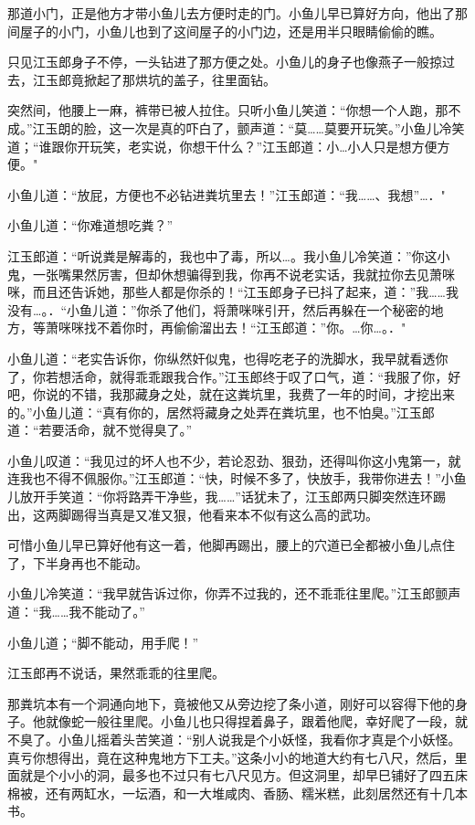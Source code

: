 \documentclass[12pt,oneside]{book}
\begin{document}
那道小门，正是他方才带小鱼儿去方便时走的门。小鱼儿早已算好方向，他出了那间屋子的小门，小鱼儿也到了这间屋子的小门边，还是用半只眼睛偷偷的瞧。

只见江玉郎身子不停，一头钻进了那方便之处。小鱼儿的身子也像燕子一般掠过去，江玉郎竟掀起了那烘坑的盖子，往里面钻。

突然间，他腰上一麻，裤带已被人拉住。只听小鱼儿笑道：``你想一个人跑，那不成。''江玉朗的脸，这一次是真的吓白了，颤声道：``莫\ldots\ldots 莫要开玩笑。''小鱼儿冷笑道；``谁跟你开玩笑，老实说，你想干什么？''江玉郎道：小\ldots 小人只是想方便方便。"

小鱼儿道：``放屁，方便也不必钻进粪坑里去！''江玉郎道：``我\ldots\ldots、我想''\ldots．"

小鱼儿道：``你难道想吃粪？''

江玉郎道：``听说粪是解毒的，我也中了毒，所以\ldots。我小鱼儿冷笑道：''你这小鬼，一张嘴果然厉害，但却休想骗得到我，你再不说老实话，我就拉你去见萧咪咪，而且还告诉她，那些人都是你杀的！``江玉郎身子已抖了起来，道：''我\ldots\ldots 我没有\ldots。．``小鱼儿道：''你杀了他们，将萧咪咪引开，然后再躲在一个秘密的地方，等萧咪咪找不着你时，再偷偷溜出去！``江玉郎道：''你。\ldots 你\ldots。．"

小鱼儿道：``老实告诉你，你纵然奸似鬼，也得吃老子的洗脚水，我早就看透你了，你若想活命，就得乖乖跟我合作。''江玉郎终于叹了口气，道：``我服了你，好吧，你说的不错，我那藏身之处，就在这粪坑里，我费了一年的时间，才挖出来的。''小鱼儿道：``真有你的，居然将藏身之处弄在粪坑里，也不怕臭。''江玉郎道：``若要活命，就不觉得臭了。''

小鱼儿叹道：``我见过的坏人也不少，若论忍劲、狠劲，还得叫你这小鬼第一，就连我也不得不佩服你。''江玉郎道：``快，时候不多了，快放手，我带你进去！''小鱼儿放开手笑道：``你将路弄干净些，我\ldots\ldots{}''话犹未了，江玉郎两只脚突然连环踢出，这两脚踢得当真是又准又狠，他看来本不似有这么高的武功。

可惜小鱼儿早已算好他有这一着，他脚再踢出，腰上的穴道已全都被小鱼儿点住了，下半身再也不能动。

小鱼儿冷笑道：``我早就告诉过你，你弄不过我的，还不乖乖往里爬。''江玉郎颤声道：``我\ldots\ldots 我不能动了。''

小鱼儿道；``脚不能动，用手爬！''

江玉郎再不说话，果然乖乖的往里爬。

那粪坑本有一个洞通向地下，竟被他又从旁边挖了条小道，刚好可以容得下他的身子。他就像蛇一般往里爬。小鱼儿也只得捏着鼻子，跟着他爬，幸好爬了一段，就不臭了。小鱼儿摇着头苦笑道：``别人说我是个小妖怪，我看你才真是个小妖怪。真亏你想得出，竟在这种鬼地方下工夫。''这条小小的地道大约有七八尺，然后，里面就是个小小的洞，最多也不过只有七八尺见方。但这洞里，却早巳铺好了四五床棉被，还有两缸水，一坛酒，和一大堆咸肉、香肠、糯米糕，此刻居然还有十几本书。
\end{document}
